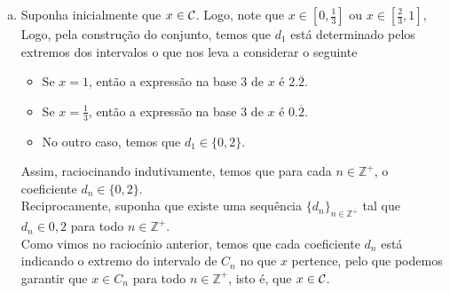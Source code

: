 \begin{homeworkProblem}[2]
\begin{solution}
\begin{enumerate}[a)]
        Observe que, um dos extremos de $J_n$ pertence a $\cali{C}$, pois os extremos dos intervalos da construção de Cantor permanecem em todo $C_n$. Escolhemos esse extremo e o denotamos por $y_n$.\\
        Portanto, temos que $y_n\in C$, $y_n\neq x$ e
        \begin{align*}
          |x-y_n|\leq |I_n|=\frac{1}{3^n}.
        \end{align*}
        O que nos permite garantir que o $\lim_{n\to\infty}y_n=x$. Assim, como $x\in \cali{C}$ é arbitrário, temos que todo ponto de $\cali{C}$ é ponto de acumulação de $\cali{C}$, isto é, $\cali{C}$ não possui pontos isolados.
      \item Suponha inicialmente que $x\in \cali{C}$. Logo, note que $x\in \left[ 0,\frac{1}{3} \right]$ ou $x\in\left[ \frac{2}{3},1 \right]$, Logo, pela construção do conjunto, temos que $d_1$ está determinado pelos extremos dos intervalos o que nos leva a considerar o seguinte
        \begin{itemize}
          \item Se $x=1$, então a expressão na base $3$ de $x$ é $2.\overline{2}$.
          \item Se $x=\frac{1}{3}$, então a expressão na base $3$ de $x$ é $0.\overline{2}$.
          \item No outro caso, temos que $d_1\in\{0,2\}$. 
        \end{itemize}
        Assim, raciocinando indutivamente, temos que para cada $n\in\mathbb{Z}^{+}$, o coeficiente $d_n\in\{0,2\}$.\\
        Reciprocamente, suponha que existe uma sequência $\{d_n\}_{n\in\mathbb{Z}^{+}}$ tal que $d_n\in{0,2}$ para todo $n\in\mathbb{Z}^{+}$.\\
        Como vimos no raciocínio anterior, temos que cada coeficiente $d_n$ está indicando o extremo do intervalo de $C_n$ no que $x$ pertence, pelo que podemos garantir que $x\in C_n$ para todo $n\in\mathbb{Z}^{+}$, isto é, que $x\in\cali{C}$.
    \end{enumerate}
  \end{solution}
\end{homeworkProblem}
